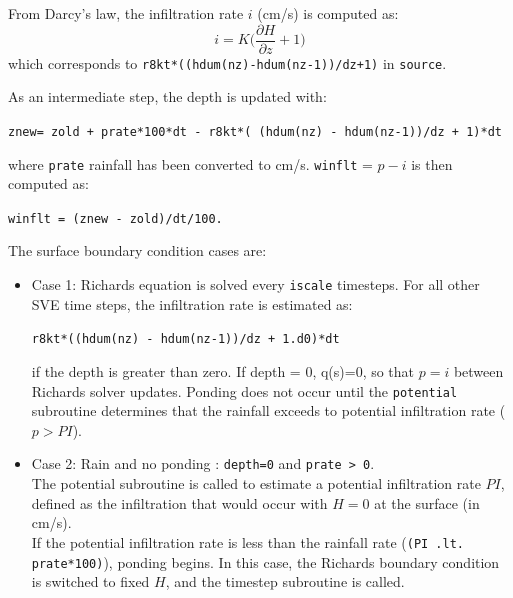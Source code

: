 \documentclass{article}
\newcommand{\code}[1]{\texttt{#1}}
\begin{document}
\noindent From Darcy's law, the infiltration rate $i$ (cm/s) is computed as:
$$ i =  K \bigg(\frac{\partial H}{\partial z} + 1\bigg ) $$
which corresponds to \code{r8kt*((hdum(nz)-hdum(nz-1))/dz+1)} in \code{source}.

\noindent  As an intermediate step, the depth is updated with: \\
\begin{center}
\code{znew=  zold + prate*100*dt - r8kt*( (hdum(nz) - hdum(nz-1))/dz + 1)*dt } 	
\end{center}
where \code{prate}  rainfall has been converted to cm/s.
 \code{winflt} = $p-i$  is then computed as:
\begin{center}
 \code{winflt = (znew - zold)/dt/100.} 	
\end{center}

	
 



The  surface boundary condition cases are:

\begin{itemize}
	\item  Case 1: Richards equation is solved every \code{iscale} timesteps. 
		  For all other SVE time steps, the infiltration rate is estimated as:
		  \begin{center}
			\code{r8kt*((hdum(nz) - hdum(nz-1))/dz + 1.d0)*dt} 		  	
		  \end{center}
			if the depth is greater than zero.   If depth = 0, q(s)=0, so that $p = i $ between Richards solver updates.  Ponding does not occur until the \code{potential} subroutine determines that the rainfall exceeds to potential infiltration rate ($p>PI$). 		
		
	\item Case 2: Rain and no ponding : \code{depth=0} and \code{prate > 0}. \\
		 The potential subroutine is called to estimate a potential infiltration rate $PI$, defined as the infiltration that would occur with $H=0$ at the surface (in cm/s). \\  
	    If the potential infiltration rate is less than the rainfall rate (\code{(PI .lt. prate*100)}), ponding begins.  In this case, the Richards boundary condition is switched to fixed $H$, and the timestep subroutine is called. 

	
\end{itemize}
	
\end{document}
